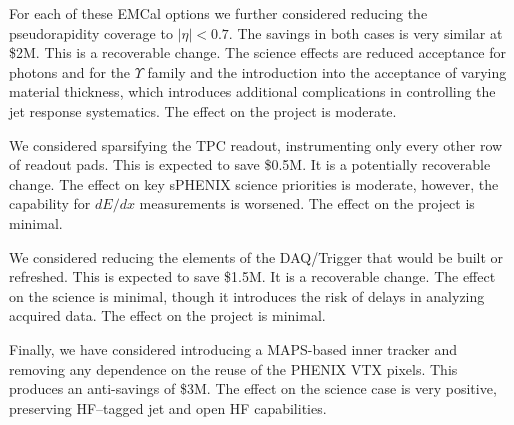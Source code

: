 For each of these EMCal options we further considered reducing the
pseudorapidity coverage to $|\eta| < 0.7$.  The savings in both cases
is very similar at \$2M.  This is a recoverable change.  The science
effects are reduced acceptance for photons and for the $\Upsilon$
family and the introduction into the acceptance of varying material
thickness, which introduces additional complications in controlling
the jet response systematics. The effect on the project is moderate.

We considered sparsifying the TPC readout, instrumenting only every
other row of readout pads.  This is expected to save \$0.5M.  It is a
potentially recoverable change. The effect on key sPHENIX science
priorities is moderate, however, the capability for $dE/dx$
measurements is worsened.  The effect on the project is minimal. 

We considered reducing the elements of the DAQ/Trigger that would be
built or refreshed.  This is expected to save \$1.5M.  It is a
recoverable change.  The effect on the science is minimal, though it
introduces the risk of delays in analyzing acquired data. The effect
on the project is minimal. 

Finally, we have considered introducing a MAPS-based inner tracker and
removing any dependence on the reuse of the PHENIX VTX pixels.  This
produces an anti-savings of \$3M.  The effect on the science case is
very positive, preserving HF--tagged jet and open HF capabilities. 





